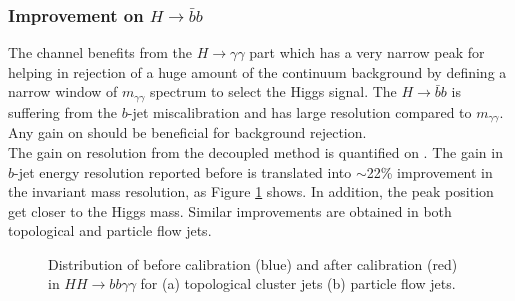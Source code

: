 \subsubsection{Improvement on $H\rightarrow\bar{b}b$}
The \HHyybb channel benefits from the $H\rightarrow\gamma\gamma$ part which has a very narrow peak for \myy helping in rejection of a huge amount of the continuum background by defining a narrow window of $m_{\gamma\gamma}$ spectrum to select the Higgs signal. The $H\rightarrow\bar{b}b$ is suffering from the $b$-jet miscalibration and has large \mbb resolution compared to $m_{\gamma\gamma}$. Any gain on \mbb should be beneficial for background rejection.\\
The gain on \mbb resolution from the decoupled method is quantified on \HHyybb. The gain in $b$-jet energy resolution reported before is translated into $\sim$22\% improvement in the \mbb invariant mass resolution, as Figure \ref{fig:Jet:Cal:BCal:Result:mbb} shows. In addition, the \mbb peak position get closer to the Higgs mass. Similar improvements are obtained in both topological and particle flow jets. \\
\begin{figure}[htbp]
   \centering
   \quad
   \begin{tcolorbox}[colback=black!5!white,colframe=white!75!black]
   \caption{Distribution of \mbb before calibration (blue) and after calibration (red) in $HH\rightarrow bb\gamma\gamma$ for (a) topological cluster jets (b) particle flow jets.}
   \label{fig:Jet:Cal:BCal:Result:mbb}
   \end{tcolorbox}
\end{figure}
